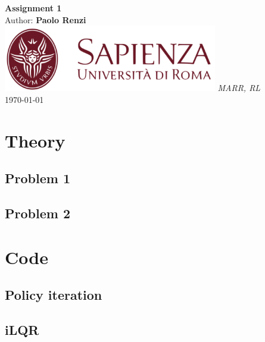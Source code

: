 \documentclass[10pt,a4paper]{article}
\begin{document}
\begin{titlepage}
    \begin{center}
        \vspace*{1cm}
        \Huge\textbf{Assignment 1}\\
        \vspace{1.5cm}
        \Large Author:
        \textbf{Paolo Renzi}\\
        \vspace{0.5cm}
        \vfill
        \includegraphics[width=0.7\textwidth]{images/sapienza_logo.png}
        \vfill
        \vspace{0.8cm}
        \Large \textit{MARR, RL}\\
        \today
    \end{center}
\end{titlepage}
\newpage

\section*{Theory}
\subsection*{Problem 1}

\newpage
\subsection*{Problem 2}

\newpage
\section*{Code}

\subsection*{Policy iteration}

\newpage
\subsection*{iLQR}
\end{document}
